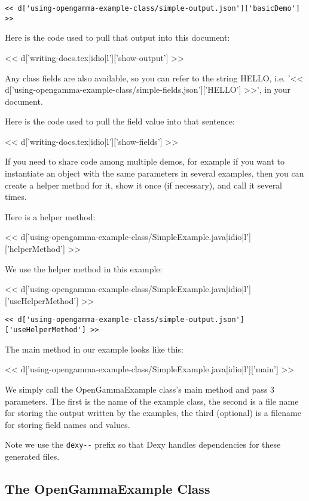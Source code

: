 \begin{Verbatim}
<< d['using-opengamma-example-class/simple-output.json']['basicDemo'] >>
\end{Verbatim}

Here is the code used to pull that output into this document:

<< d['writing-docs.tex|idio|l']['show-output'] >>

Any class fields are also available, so you can refer to the string HELLO, i.e.
'<< d['using-opengamma-example-class/simple-fields.json']['HELLO'] >>', in your document.

Here is the code used to pull the field value into that sentence:

<< d['writing-docs.tex|idio|l']['show-fields'] >>

If you need to share code among multiple demos, for example if you want to instantiate an object with the same parameters in several examples, then you can create a helper method for it, show it once (if necessary), and call it several times.

Here is a helper method:

<< d['using-opengamma-example-class/SimpleExample.java|idio|l']['helperMethod'] >>

We use the helper method in this example:

<< d['using-opengamma-example-class/SimpleExample.java|idio|l']['useHelperMethod'] >>

\begin{Verbatim}
<< d['using-opengamma-example-class/simple-output.json']['useHelperMethod'] >>
\end{Verbatim}

The main method in our example looks like this:

<< d['using-opengamma-example-class/SimpleExample.java|idio|l']['main'] >>

We simply call the OpenGammaExample class's main method and pass 3 parameters.
The first is the name of the example class, the second is a file name for
storing the output written by the examples, the third (optional) is a filename
for storing field names and values.

Note we use the \verb|dexy--| prefix so that Dexy handles dependencies for
these generated files.

\subsection{The OpenGammaExample Class}


